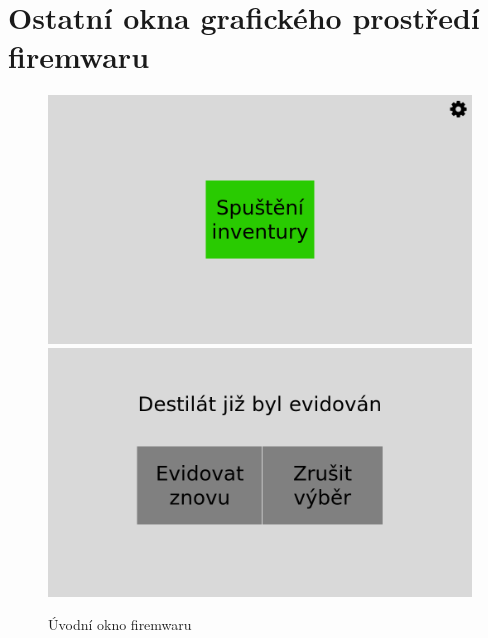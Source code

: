 \chapter{Ostatní okna grafického prostředí firemwaru}

\begin{figure}[!h]
    \begin{center}
        \includegraphics[scale=0.22]{obrazky/GUI Spuštění inventury.png}
        \includegraphics[scale=0.22]{obrazky/GUI Duplicidita.png}  
    \end{center}
    \caption{Úvodní okno firemwaru}
    \label{Úvodní okno aplikace}
\end{figure}


